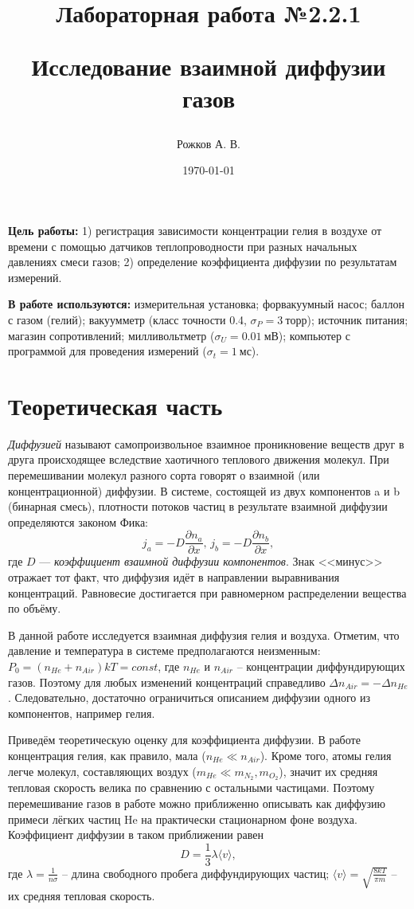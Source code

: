 \documentclass[a4paper, 12pt]{article}
\title{\begin{center}Лабораторная работа №2.2.1\end{center}
Исследование взаимной диффузии газов}
\author{Рожков А. В.}
\date{\today}
\begin{document}
    \maketitle
    \newpage

    \textbf{Цель работы:} 1) регистрация зависимости концентрации гелия в воздухе от времени с помощью датчиков теплопроводности при разных начальных давлениях смеси газов; 2) определение коэффициента диффузии по результатам измерений.

    \textbf{В работе используются:} измерительная установка; форвакуумный насос; баллон с газом  (гелий); вакуумметр (класс точности 0.4, $\sigma_P = 3~торр$); источник питания; магазин сопротивлений; милливольтметр ($\sigma_U = 0.01~мВ$); компьютер с программой для проведения измерений ($\sigma_t = 1~мс$).


    \section{Теоретическая часть}
        \textit{Диффузией}  называют самопроизвольное взаимное проникновение веществ друг в друга происходящее вследствие хаотичного теплового движения молекул. При перемешивании молекул разного сорта говорят о взаимной (или концентрационной) диффузии. В системе, состоящей из двух компонентов a и b (бинарная смесь), плотности потоков частиц в результате взаимной диффузии определяются законом Фика:
        \begin{equation}
            j_a = -D \frac{\partial n_a}{\partial x}, \, j_b = -D \frac{\partial n_b}{\partial x},
        \end{equation}
        где $D$ — \textit{коэффициент взаимной диффузии компонентов}. Знак <<минус>> отражает тот факт, что диффузия идёт в направлении выравнивания концентраций. Равновесие достигается при равномерном распределении вещества по объёму.

        В данной работе исследуется взаимная диффузия гелия и воздуха. Отметим, что давление и температура в системе предполагаются неизменным: $P_0 = (n_{He}+n_{Air})kT = const$, где $n_{He}$  и $n_{Air}$ -- концентрации диффундирующих газов. Поэтому для любых изменений концентраций справедливо $\Delta n_{Air} = -\Delta n_{He}$. Следовательно, достаточно ограничиться описанием диффузии одного из компонентов, например гелия.

        Приведём теоретическую оценку для коэффициента диффузии. В работе концентрация гелия, как правило, мала ($n_{He} \ll n_{Air}$). Кроме того, атомы гелия легче молекул, составляющих воздух ($m_{He} \ll m_{N_2}, m_{O_2}$), значит их средняя тепловая скорость велика по сравнению с остальными частицами. Поэтому перемешивание газов в работе можно приближенно описывать как диффузию примеси лёгких частиц He на практически стационарном фоне воздуха. Коэффициент диффузии в таком приближении равен
        \begin{equation}
            \label{D}
            D = \frac{1}{3} \lambda \langle v \rangle,
        \end{equation}
        где $\lambda = \frac{1}{n\sigma}$ -- длина свободного пробега диффундирующих частиц; $\langle v \rangle = \sqrt{\frac{8kT}{\pi m}}$ -- их средняя тепловая скорость.
\end{document}
